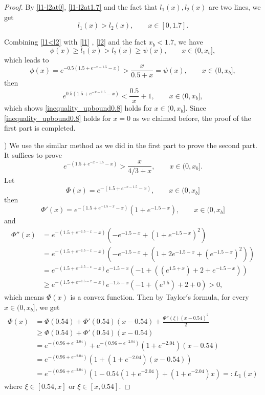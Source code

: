 \documentclass{HZNUMCM}
\begin{document}
\begin{proof}
By \eqref{l1-l2at0}, \eqref{l1-l2at1.7} and the fact that $l_1(x),l_2(x)$ are two lines, we get
\begin{equation}\label{l1<l2}
l_1(x)>l_2(x),\qquad x\in[0,1.7].
\end{equation}

Combining \eqref{l1<l2} with  \eqref{l1} , \eqref{l2} and the fact $x_b<1.7$, we have
$$
\phi(x)\geqslant l_1(x)> l_2(x)\geqslant\psi(x),\qquad x\in(0,x_b],
$$
which leads to
$$
\phi(x)=e^{-0.5(1.5 + e^{-x-1.5} - x)}>\frac{x}{0.5+x}=\psi(x),\qquad x\in(0,x_b],
$$then
$$
e^{0.5(1.5 + e^{-x-1.5} - x)}<\frac{0.5}{x}+1,\qquad x\in(0,x_b],
$$
which shows \eqref{inequality_upbound0.8} holds for $x\in (0,x_b]$. Since \eqref{inequality_upbound0.8} holds for $x=0$ as we claimed before, the proof of the first part is completed.

) We use the similar method as we did in the first part to  prove the second part. It suffices to prove
\begin{equation}\label{targetineq}
e^{-(1.5 + e^{-x-1.5} - x)}>\frac{x}{4/3+x},\qquad x\in(0,x_b].
\end{equation}
Let $$\Phi(x)=e^{-(1.5 + e^{-x-1.5} - x)},\qquad x\in(0,x_b]$$
then $$\Phi'(x)= e^{-\left(1.5 +e^{-1.5-x}-x\right)} \left(1+e^{-1.5-x}\right),\qquad x\in(0,x_b]
$$
and
\begin{align*}
\Phi''(x)&=e^{- \left(1.5 +e^{-1.5-x}-x\right)} (- e^{-1.5-x}+ \left(1+e^{-1.5-x}\right)^2)\\
        &= e^{- \left(1.5 +e^{-1.5-x}-x\right)}(- e^{-1.5-x}+(1+2 e^{-1.5-x}+( e^{-1.5-x})^2))\\
        &=e^{- \left(1.5 +e^{-1.5-x}-x\right)}e^{-1.5-x}(-1+((e^{1.5+x})+2 +e^{-1.5-x}))\\
        &\geqslant e^{- \left(1.5 +e^{-1.5-x}-x\right)}e^{-1.5-x}(-1+(e^{1.5})+2+0)> 0,
\end{align*}which means $\Phi(x)$ is a convex function. Then  by Taylor$'$s formula, for every $x\in(0,x_b]$, we get
\begin{equation}\label{L1}
\begin{split}
\Phi(x)&= \Phi(0.54)+\Phi'(0.54)(x-0.54)+\frac{\Phi''(\xi)(x-0.54)^2}2\\
&\geqslant \Phi(0.54)+\Phi'(0.54)(x-0.54)\\
&=e^{-(0.96 + e^{-2.04} )}+e^{- \left(0.96 +e^{-2.04}\right)} \left(1+e^{-2.04}\right)(x-0.54)\\
&=e^{-(0.96 + e^{-2.04} )}(1+ \left(1+e^{-2.04}\right)(x-0.54))\\
&=e^{-(0.96 + e^{-2.04} )}(1-0.54 \left(1+e^{-2.04}\right)+ \left(1+e^{-2.04}\right)x)=:L_1(x)
\end{split}
\end{equation}where $\xi\in[0.54,x] \text{~or~} \xi\in[x,0.54]$.


\end{proof}
\end{document}
